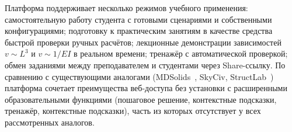 Платформа поддерживает несколько режимов учебного применения: самостоятельную работу студента с готовыми сценариями и собственными конфигурациями; подготовку к практическим занятиям в качестве средства быстрой проверки ручных расчётов; лекционные демонстрации зависимостей $v \sim L^3$ и $v \sim 1/EI$ в реальном времени; тренажёр с автоматической проверкой; обмен заданиями между преподавателем и студентами через Share-ссылку. По сравнению с существующими аналогами (MDSolids~\cite{philpot2003}, SkyCiv, StructLab~\cite{vasilenko}) платформа сочетает преимущества веб-доступа без установки с расширенными образовательными функциями (пошаговое решение, контекстные подсказки, тренажёр, контекстные подсказки), часть из которых отсутствует у всех рассмотренных аналогов.





